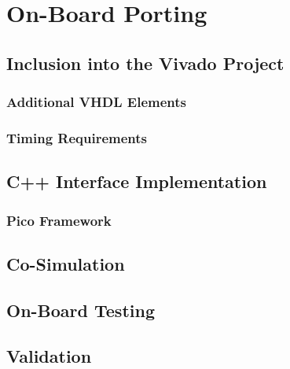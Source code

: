 
\chapter{On-Board Porting} %

\label{Chapter4} %



\section{Inclusion into the Vivado Project}

\subsection{Additional VHDL Elements}

\subsection{Timing Requirements}

\section{C++ Interface Implementation}

\subsection{Pico Framework}

\section{Co-Simulation}

\section{On-Board Testing}

\section{Validation}
